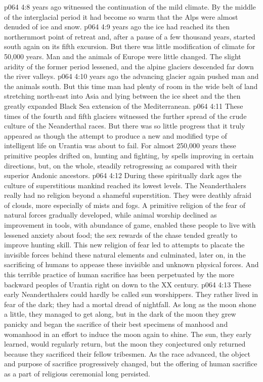 \vs p064 4:8 \pc {} years ago witnessed the continuation of the mild climate. By the middle of the interglacial period it had become so warm that the Alps were almost denuded of ice and snow.
\vs p064 4:9 \pc {} years ago the ice had reached its then northernmost point of retreat and, after a pause of a few thousand years, started south again on its fifth excursion. But there was little modification of climate for 50,000 years. Man and the animals of Europe were little changed. The slight aridity of the former period lessened, and the alpine glaciers descended far down the river valleys.
\vs p064 4:10 \pc {} years ago the advancing glacier again pushed man and the animals south. But this time man had plenty of room in the wide belt of land stretching north\hyp{}east into Asia and lying between the ice sheet and the then greatly expanded Black Sea extension of the Mediterranean.
\vs p064 4:11 These times of the fourth and fifth glaciers witnessed the further spread of the crude culture of the Neanderthal races. But there was so little progress that it truly appeared as though the attempt to produce a new and modified type of intelligent life on Urantia was about to fail. For almost 250,000 years these primitive peoples drifted on, hunting and fighting, by spells improving in certain directions, but, on the whole, steadily retrogressing as compared with their superior Andonic ancestors.
\vs p064 4:12 \pc During these spiritually dark ages the culture of superstitious mankind reached its lowest levels. The Neanderthalers really had no religion beyond a shameful superstition. They were deathly afraid of clouds, more especially of mists and fogs. A primitive religion of the fear of natural forces gradually developed, while animal worship declined as improvement in tools, with abundance of game, enabled these people to live with lessened anxiety about food; the sex rewards of the chase tended greatly to improve hunting skill. This new religion of fear led to attempts to placate the invisible forces behind these natural elements and culminated, later on, in the sacrificing of humans to appease these invisible and unknown physical forces. And this terrible practice of human sacrifice has been perpetuated by the more backward peoples of Urantia right on down to the XX century.
\vs p064 4:13 These early Neanderthalers could hardly be called sun worshippers. They rather lived in fear of the dark; they had a mortal dread of nightfall. As long as the moon shone a little, they managed to get along, but in the dark of the moon they grew panicky and began the sacrifice of their best specimens of manhood and womanhood in an effort to induce the moon again to shine. The sun, they early learned, would regularly return, but the moon they conjectured only returned because they sacrificed their fellow tribesmen. As the race advanced, the object and purpose of sacrifice progressively changed, but the offering of human sacrifice as a part of religious ceremonial long persisted.
